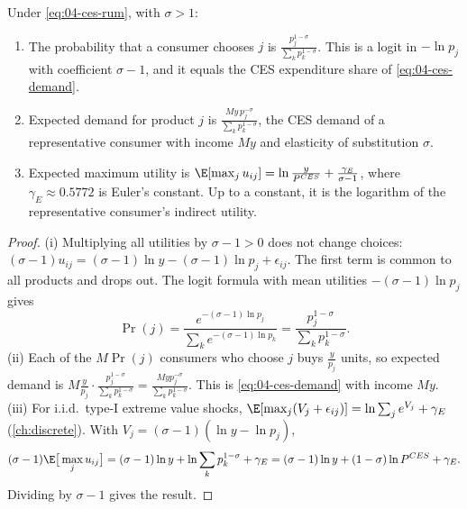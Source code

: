 \begin{proposition}\label{prop:04-ces-discrete}
Under \eqref{eq:04-ces-rum}, with $\sigma > 1$:
\begin{enumerate}[label=(\roman*)]
\item The probability that a consumer chooses $j$ is $\frac{p_j^{1-\sigma}}{\sum_k p_k^{1-\sigma}}$. This is a logit
in $-\ln p_j$ with coefficient $\sigma - 1$, and it equals the CES expenditure share of \eqref{eq:04-ces-demand}.
\item Expected demand for product $j$ is $\frac{My\,p_j^{-\sigma}}{\sum_k p_k^{1-\sigma}}$, the CES demand of a
representative consumer with income $My$ and elasticity of substitution $\sigma$.
\item Expected maximum utility is $\E[\max_j u_{ij}] = \ln\frac{y}{P^{CES}} + \frac{\gamma_E}{\sigma - 1}$, where
$\gamma_E \approx 0.5772$ is Euler's constant. Up to a constant, it is the logarithm of the representative
consumer's indirect utility.
\end{enumerate}
\end{proposition}

\begin{proof}
(i) Multiplying all utilities by $\sigma - 1 > 0$ does not change choices:
$(\sigma - 1)u_{ij} = (\sigma - 1)\ln y - (\sigma - 1)\ln p_j + \epsilon_{ij}$. The first term is common to all
products and drops out. The logit formula with mean utilities $-(\sigma - 1)\ln p_j$ \citep[eqs.~3.14--3.15]{McFadden1984}
gives
\begin{equation*}
\Pr(j) = \frac{e^{-(\sigma - 1)\ln p_j}}{\sum_k e^{-(\sigma - 1)\ln p_k}} = \frac{p_j^{1-\sigma}}{\sum_k p_k^{1-\sigma}} .
\end{equation*}
(ii) Each of the $M\Pr(j)$ consumers who choose $j$ buys $\frac{y}{p_j}$ units, so expected demand is
$M\frac{y}{p_j}\cdot\frac{p_j^{1-\sigma}}{\sum_kp_k^{1-\sigma}} = \frac{Myp_j^{-\sigma}}{\sum_kp_k^{1-\sigma}}$. This is
\eqref{eq:04-ces-demand} with income $My$.
(iii) For i.i.d.\ type-I extreme value shocks, $\E[\max_j(V_j + \epsilon_{ij})] = \ln\sum_je^{V_j} + \gamma_E$
(\cref{ch:discrete}). With $V_j = (\sigma - 1)(\ln y - \ln p_j)$,
\begin{equation*}
(\sigma - 1)\E\big[\max_j u_{ij}\big] = (\sigma - 1)\ln y + \ln\sum_kp_k^{1-\sigma} + \gamma_E
= (\sigma - 1)\ln y + (1 - \sigma)\ln P^{CES} + \gamma_E .
\end{equation*}
Dividing by $\sigma - 1$ gives the result.
\end{proof}

